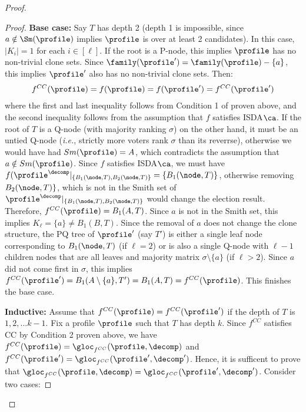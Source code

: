 \begin{proof}
\begin{proof}
    \noindent\textbf{Base case:} Say $T$ has depth 2 (depth 1 is impossible, since $a \notin \Sm(\profile)$ implies $\profile$ is over at least 2 candidates). In this case, $|K_i|=1$ for each $i \in [\ell]$. If the root is a P-node, this implies $\profile$ has no non-trivial clone sets. Since $\family(\profile') = \family(\profile) - \{a\}$, this implies $\profile'$ also  has no non-trivial clone sets. Then:
    \begin{align*}
        f^{CC}(\profile) =   f(\profile) =f(\profile')=f^{CC}(\profile')  
    \end{align*}
    where the first and last inequality follows from Condition 1 of  proven above, and the second inequality follows from the assumption that $f$ satisfies ISDA$\ca$. If the root of $T$ is a Q-node (with majority ranking $\sigma$) on the other hand, it must be an untied Q-node (\emph{i.e.}, strictly more voters rank $\sigma$ than 
    its reverrse), otherwise we would have had $Sm(\profile)=A$, which contradicts the assumption that $a\notin Sm(\profile)$. Since $f$ satisfies ISDA$\ca$, we must have $f(\profile^\decomp|_{\{B_1(\node,T),B_2(\node,T)\}} = \{B_1(\node,T)\}$, otherwise removing $B_2(\node,T)\}$, which is not in the Smith set of $\profile^\decomp|_{\{B_1(\node,T),B_2(\node,T)\}}$ would change the election result. Therefore, $f^{CC}(\profile) =  B_1(A,T)$. Since $a$ is not in the Smith set, this implies $K_\ell=\{a\} \neq B_1(B,T)$. Since the removal of $a$ does not change the clone structure, the PQ tree of $\profile'$ (say $T'$) is either a single leaf node corresponding to $B_1(\node, T)$ (if $\ell=2$) or is also a single Q-node with $\ell-1$ children nodes that are all leaves and majority matrix $\sigma \setminus\{a\}$ (if $\ell >2$). Since $a$ did not come first in $\sigma$, this implies  $f^{CC}(\profile')=B_1(A \setminus\{a\},T')= B_1(A,T)= f^{CC}(\profile)$. This finishes the base case.

    \noindent \textbf{Inductive:} Assume that $f^{CC}(\profile)= f^{CC}(\profile')$ if the depth of $T$ is $1,2,\ldots k-1$. Fix a profile $\profile$ such that $T$ has depth $k$. Since $f^{CC}$ satisfies CC by Condition 2 proven above, we have $f^{CC}(\profile) = \gloc_{f^{CC}}(\profile, \decomp)$ and $f^{CC}(\profile') = \gloc_{f^{CC}}(\profile', \decomp')$. Hence, it is sufficent to prove that $\gloc_{f^{CC}}(\profile, \decomp)=\gloc_{f^{CC}}(\profile', \decomp')$. Consider two cases:


\end{proof}
\end{proof}
